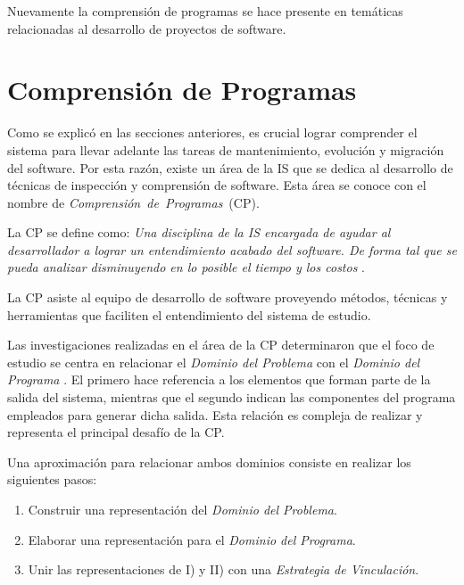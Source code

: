Nuevamente la comprensión de programas se hace presente en temáticas relacionadas al desarrollo de proyectos de software.

\section{Comprensión de Programas}

Como se explicó en las secciones anteriores, es crucial lograr comprender el sistema para llevar adelante las tareas de mantenimiento, evolución y migración del software.	
Por esta razón, existe un área de la IS que se dedica al desarrollo de técnicas de inspección y comprensión de software. Esta área se conoce con el nombre de \mbox{\textit{Comprensión de Programas} (CP).}

La CP se define como: \textit{Una disciplina de la IS encargada de ayudar al desarrollador a lograr un entendimiento acabado del software. De forma tal que se pueda analizar disminuyendo en lo posible el tiempo y los costos} \cite{MPMR07}.  

La CP asiste al equipo de desarrollo de software proveyendo métodos, técnicas y herramientas que faciliten el entendimiento del sistema de estudio.

Las investigaciones realizadas en el área de la CP determinaron que el foco de estudio se centra en relacionar el \textit{Dominio del Problema} con el \textit{Dominio del Programa} \cite{BRM10,MPMR07,AMPM11,DWE04}. El primero hace referencia a los elementos que forman parte de la salida del sistema, mientras que el segundo indican las componentes del programa empleados para generar dicha salida.
Esta relación es compleja de realizar y representa el principal desafío de la CP. 

Una aproximación para relacionar ambos dominios consiste en realizar los siguientes pasos:

\begin{enumerate}[label=\Roman*)]
\item Construir una representación del \textit{Dominio del Problema}.
\item Elaborar una representación para el \textit{Dominio del Programa}.
\item Unir las representaciones de I) y II) con una \textit{Estrategia de Vinculación}.
\end{enumerate}


